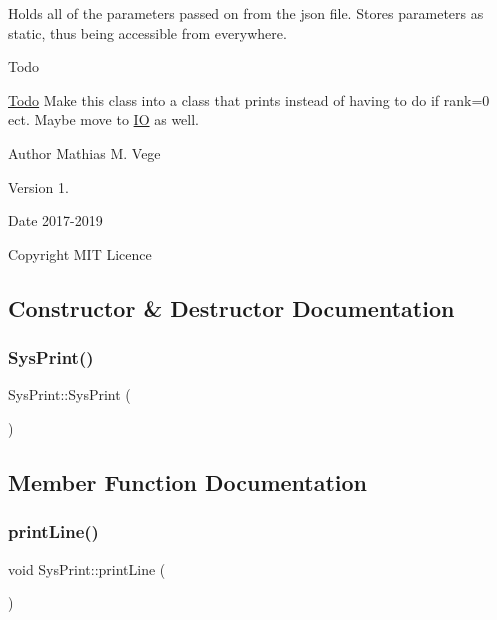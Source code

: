 Holds all of the parameters passed on from the json file. Stores parameters as static, thus being accessible from everywhere.

\begin{DoxyRefDesc}{Todo}
\item[\mbox{\hyperlink{todo__todo000001}{Todo}}]Make this class into a class that prints instead of having to do if rank=0 ect. Maybe move to \mbox{\hyperlink{namespace_i_o}{IO}} as well.\end{DoxyRefDesc}


\begin{DoxyAuthor}{Author}
Mathias M. Vege 
\end{DoxyAuthor}
\begin{DoxyVersion}{Version}
1. 
\end{DoxyVersion}
\begin{DoxyDate}{Date}
2017-\/2019 
\end{DoxyDate}
\begin{DoxyCopyright}{Copyright}
M\+IT Licence 
\end{DoxyCopyright}


\subsection{Constructor \& Destructor Documentation}
\mbox{\label{class_sys_print_a205d71843ed2243d76300df6b854bed8}} 
\subsubsection{\texorpdfstring{SysPrint()}{SysPrint()}}
{\footnotesize\ttfamily Sys\+Print\+::\+Sys\+Print (\begin{DoxyParamCaption}{ }\end{DoxyParamCaption})}



\subsection{Member Function Documentation}
\mbox{\label{class_sys_print_abdf8282e73cc002e5e572c6f09266cc9}} 
\subsubsection{\texorpdfstring{printLine()}{printLine()}}
{\footnotesize\ttfamily void Sys\+Print\+::print\+Line (\begin{DoxyParamCaption}{ }\end{DoxyParamCaption})\hspace{0.3cm}{\ttfamily [static]}}



